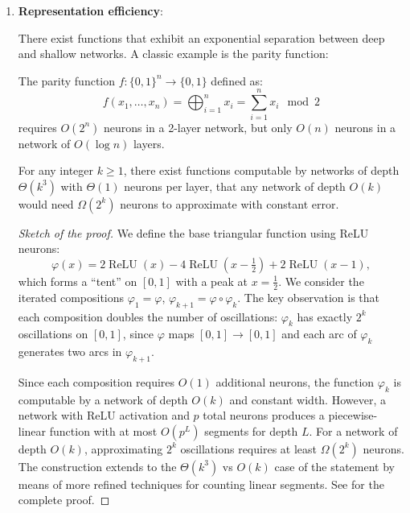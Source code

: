 \begin{enumerate}
	\item \textbf{Representation efficiency}:

	There exist functions that exhibit an exponential separation between deep and shallow networks. A classic example is the parity function:

	\begin{example}
		The parity function \(f: \{0,1\}^n \to \{0,1\}\) defined as:
		\[
			f(x_1, \ldots, x_n) = \bigoplus_{i=1}^n x_i = \sum_{i=1}^n x_i \mod 2
		\]
		requires \(O(2^n)\) neurons in a 2-layer network, but only \(O(n)\) neurons in a network of \(O(\log n)\) layers.
	\end{example}

	\begin{theorem}
		For any integer \(k \geq 1\), there exist functions computable by networks of depth \(\Theta(k^3)\) with \(\Theta(1)\) neurons per layer, that any network of depth \(O(k)\) would need \(\Omega(2^k)\) neurons to approximate with constant error.
	\end{theorem}

	\begin{proof}[Sketch of the proof]
		We define the base triangular function using ReLU neurons:
		\[
			\varphi(x) = 2\operatorname{ReLU}(x) - 4\operatorname{ReLU}\!\left(x - \tfrac{1}{2}\right) + 2\operatorname{ReLU}(x - 1),
		\]
		which forms a ``tent'' on $[0,1]$ with a peak at $x = \tfrac{1}{2}$. We consider the iterated compositions $\varphi_1 = \varphi$, $\varphi_{k+1} = \varphi \circ \varphi_k$. The key observation is that each composition doubles the number of oscillations: $\varphi_k$ has exactly $2^k$ oscillations on $[0,1]$, since $\varphi$ maps $[0,1] \to [0,1]$ and each arc of $\varphi_k$ generates two arcs in $\varphi_{k+1}$.

		Since each composition requires $O(1)$ additional neurons, the function $\varphi_k$ is computable by a network of depth $O(k)$ and constant width. However, a network with ReLU activation and $p$ total neurons produces a piecewise-linear function with at most $O(p^L)$ segments for depth $L$. For a network of depth $O(k)$, approximating $2^k$ oscillations requires at least $\Omega(2^k)$ neurons. The construction extends to the $\Theta(k^3)$ vs $O(k)$ case of the statement by means of more refined techniques for counting linear segments. See \citet{telgarsky2016benefitsdepthneuralnetworks} for the complete proof.
	\end{proof}


\end{enumerate}
